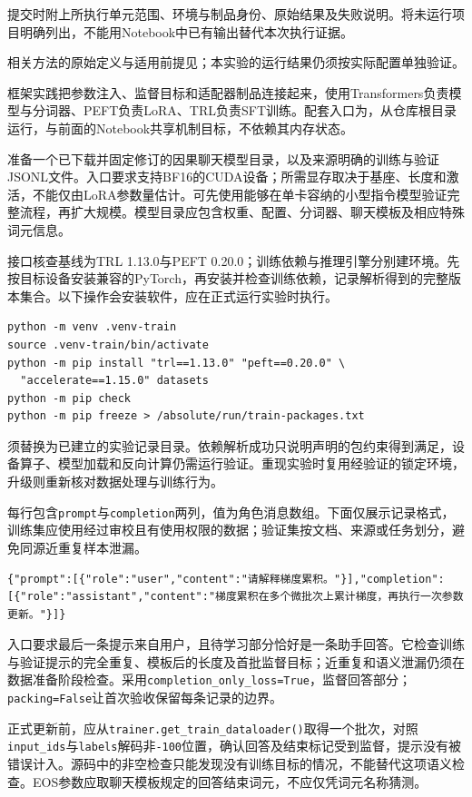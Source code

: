 提交时附上所执行单元范围、环境与制品身份、原始结果及失败说明。将未运行项目明确列出，不能用Notebook中已有输出替代本次执行证据。

相关方法的原始定义与适用前提见\cite{huLoRALowRankAdaptation2022}；本实验的运行结果仍须按实际配置单独验证。


框架实践把参数注入、监督目标和适配器制品连接起来，使用Transformers负责模型与分词器、PEFT负责LoRA、TRL负责SFT训练\cite{HuggingfaceTransformers2018,huggingfacePEFT2023,huggingface2026trlframework}。配套入口为，从仓库根目录运行，与前面的Notebook共享机制目标，不依赖其内存状态。

准备一个已下载并固定修订的因果聊天模型目录，以及来源明确的训练与验证JSONL文件。入口要求支持BF16的CUDA设备；所需显存取决于基座、长度和激活，不能仅由LoRA参数量估计。可先使用能够在单卡容纳的小型指令模型验证完整流程，再扩大规模。模型目录应包含权重、配置、分词器、聊天模板及相应特殊词元信息。

接口核查基线为TRL 1.13.0与PEFT 0.20.0；训练依赖与推理引擎分别建环境。先按目标设备安装兼容的PyTorch，再安装并检查训练依赖，记录解析得到的完整版本集合。以下操作会安装软件，应在正式运行实验时执行。
\begin{verbatim}
python -m venv .venv-train
source .venv-train/bin/activate
python -m pip install "trl==1.13.0" "peft==0.20.0" \
  "accelerate==1.15.0" datasets
python -m pip check
python -m pip freeze > /absolute/run/train-packages.txt
\end{verbatim}
须替换为已建立的实验记录目录。依赖解析成功只说明声明的包约束得到满足，设备算子、模型加载和反向计算仍需运行验证。重现实验时复用经验证的锁定环境，升级则重新核对数据处理与训练行为。

每行包含\texttt{prompt}与\texttt{completion}两列，值为角色消息数组。下面仅展示记录格式，训练集应使用经过审校且有使用权限的数据；验证集按文档、来源或任务划分，避免同源近重复样本泄漏。
\begin{verbatim}
{"prompt":[{"role":"user","content":"请解释梯度累积。"}],"completion":[{"role":"assistant","content":"梯度累积在多个微批次上累计梯度，再执行一次参数更新。"}]}
\end{verbatim}
入口要求最后一条提示来自用户，且待学习部分恰好是一条助手回答。它检查训练与验证提示的完全重复、模板后的长度及首批监督目标；近重复和语义泄漏仍须在数据准备阶段检查。采用\texttt{completion\_only\_loss=True}，监督回答部分；\texttt{packing=False}让首次验收保留每条记录的边界。

正式更新前，应从\texttt{trainer.get\_train\_dataloader()}取得一个批次，对照\texttt{input\_ids}与\texttt{labels}解码非\texttt{-100}位置，确认回答及结束标记受到监督，提示没有被错误计入。源码中的非空检查只能发现没有训练目标的情况，不能替代这项语义检查。EOS参数应取聊天模板规定的回答结束词元，不应仅凭词元名称猜测。

